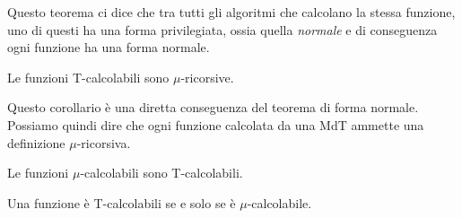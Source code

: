 Questo teorema ci dice che tra tutti gli algoritmi che calcolano
la stessa funzione, uno di questi ha una forma privilegiata,
ossia quella \emph{normale} e di conseguenza ogni funzione ha
una forma normale.

\begin{theorem}
	Le funzioni T-calcolabili sono $\mu$-ricorsive.
\end{theorem}

Questo corollario è una diretta conseguenza del teorema di
forma normale. Possiamo quindi dire che ogni funzione calcolata
da una MdT ammette una definizione $\mu$-ricorsiva.

\begin{lemma}
	Le funzioni $\mu$-calcolabili sono T-calcolabili.
\end{lemma}

\begin{theorem}
	Una funzione è T-calcolabili se e solo se è
	$\mu$-calcolabile.
\end{theorem}
